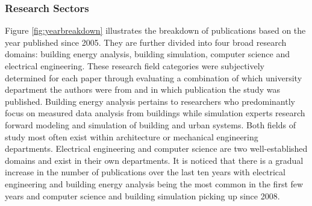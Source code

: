\subsubsection{Research Sectors}
\label{sec:subsectors}

Figure \ref{fig:yearbreakdown} illustrates the breakdown of publications based on the year published since 2005. They are further divided into four broad research domains: building energy analysis, building simulation, computer science and electrical engineering. These research field categories were subjectively determined for each paper through evaluating a combination of which university department the authors were from and in which publication the study was published. Building energy analysis pertains to researchers who predominantly focus on measured data analysis from buildings while simulation experts research forward modeling and simulation of building and urban systems. Both fields of study most often exist within architecture or mechanical engineering departments. Electrical engineering and computer science are two well-established domains and exist in their own departments. It is noticed that there is a gradual increase in the number of publications over the last ten years with electrical engineering and building energy analysis being the most common in the first few years and computer science and building simulation picking up since 2008. 